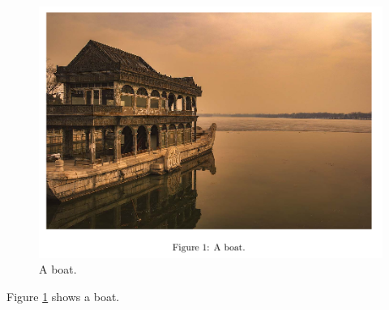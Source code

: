 \documentclass{article}
\begin{document}
\begin{figure}
    \centering
    \includegraphics[width=0.4\linewidth]{boat.png}
    \caption{A boat.}
    \label{fig:boat1}
\end{figure}

Figure \ref{fig:boat1} shows a boat.
\end{document}
